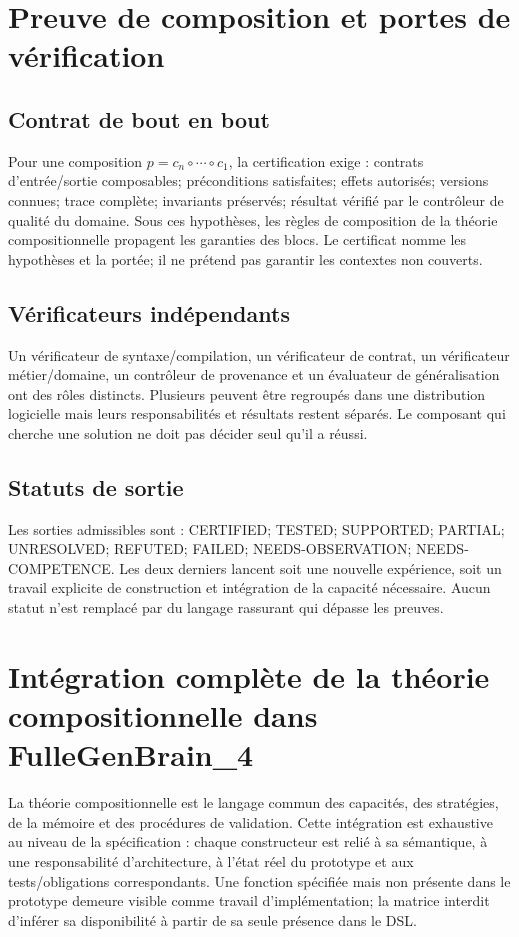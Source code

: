 \documentclass[11pt,a4paper]{article}
\newcommand{\State}[1]{\textsf{#1}}
\begin{document}
\section{Preuve de composition et portes de vérification}
\subsection{Contrat de bout en bout}
Pour une composition $p=c_n\circ\cdots\circ c_1$, la certification exige : contrats d'entrée/sortie composables; préconditions satisfaites; effets autorisés; versions connues; trace complète; invariants préservés; résultat vérifié par le contrôleur de qualité du domaine. Sous ces hypothèses, les règles de composition de la théorie compositionnelle propagent les garanties des blocs. Le certificat nomme les hypothèses et la portée; il ne prétend pas garantir les contextes non couverts.

\subsection{Vérificateurs indépendants}
Un vérificateur de syntaxe/compilation, un vérificateur de contrat, un vérificateur métier/domaine, un contrôleur de provenance et un évaluateur de généralisation ont des rôles distincts. Plusieurs peuvent être regroupés dans une distribution logicielle mais leurs responsabilités et résultats restent séparés. Le composant qui cherche une solution ne doit pas décider seul qu'il a réussi.

\subsection{Statuts de sortie}
Les sorties admissibles sont : \State{CERTIFIED}; \State{TESTED}; \State{SUPPORTED}; \State{PARTIAL}; \State{UNRESOLVED}; \State{REFUTED}; \State{FAILED}; \State{NEEDS-OBSERVATION}; \State{NEEDS-COMPETENCE}. Les deux derniers lancent soit une nouvelle expérience, soit un travail explicite de construction et intégration de la capacité nécessaire. Aucun statut n'est remplacé par du langage rassurant qui dépasse les preuves.

\section{Intégration complète de la théorie compositionnelle dans FulleGenBrain\_4}
La théorie compositionnelle est le langage commun des capacités, des stratégies, de la mémoire et des procédures de validation. Cette intégration est exhaustive au niveau de la spécification : chaque constructeur est relié à sa sémantique, à une responsabilité d'architecture, à l'état réel du prototype et aux tests/obligations correspondants. Une fonction spécifiée mais non présente dans le prototype demeure visible comme travail d'implémentation; la matrice interdit d'inférer sa disponibilité à partir de sa seule présence dans le DSL.
\end{document}
